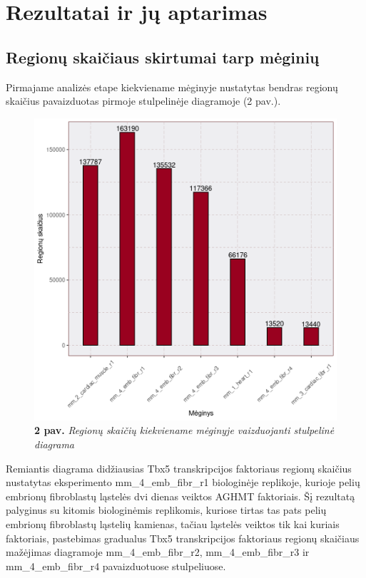 \documentclass[12pt]{article}
\begin{document}
\newpage


\section{Rezultatai ir jų aptarimas}
\subsection{Regionų skaičiaus skirtumai tarp mėginių}
Pirmajame analizės etape kiekviename mėginyje nustatytas bendras
regionų skaičius pavaizduotas pirmoje stulpelinėje diagramoje
(2 pav.).

\begin{figure}[htb]
    \begin{center}
        \includegraphics[width=0.7\linewidth]{../Figures/total_peak_counts.png}
        \caption*{\textbf{2 pav.} \emph{Regionų skaičių kiekviename mėginyje
        vaizduojanti stulpelinė diagrama}}
    \end{center}
\end{figure}

Remiantis diagrama didžiausias Tbx5 transkripcijos faktoriaus
regionų skaičius nustatytas eksperimento mm\_4\_emb\_fibr\_r1
biologinėje replikoje, kurioje pelių embrionų fibroblastų ląstelės
dvi dienas veiktos AGHMT faktoriais.
Šį rezultatą palyginus su kitomis biologinėmis replikomis, kuriose
tirtas tas pats pelių embrionų fibroblastų ląstelių kamienas, tačiau
ląstelės veiktos tik kai kuriais faktoriais, pastebimas gradualus
Tbx5 transkripcijos faktoriaus regionų skaičiaus mažėjimas
diagramoje mm\_4\_emb\_fibr\_r2, mm\_4\_emb\_fibr\_r3 ir
mm\_4\_emb\_fibr\_r4 pavaizduotuose stulpeliuose.
\end{document}

